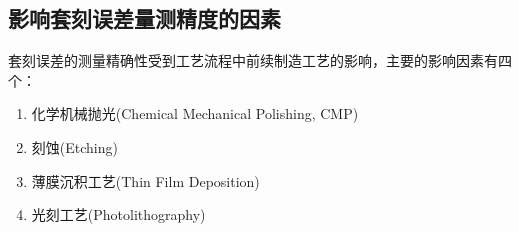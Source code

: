 \subsection{影响套刻误差量测精度的因素~\label{影响套刻误差量测精度的因素}}

套刻误差的测量精确性受到工艺流程中前续制造工艺的影响，主要的影响因素有四个：
\begin{enumerate}[leftmargin=*] 
\setlength{\itemsep}{2pt}
\setlength{\parsep}{0pt}
\setlength{\parskip}{0pt}
\item 化学机械抛光(Chemical Mechanical Polishing, CMP)
\item 刻蚀(Etching)
\item 薄膜沉积工艺(Thin Film Deposition)
\item 光刻工艺(Photolithography)
\end{enumerate}